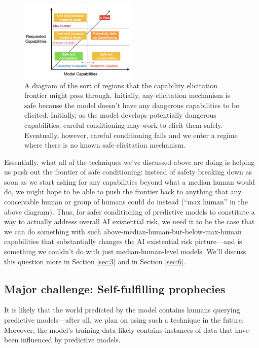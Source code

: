 \documentclass[
  twocolumn,
  natbib,
]{miri-tech-article}
\begin{document}
\begin{figure}[h!]
  \centering
  \includegraphics[width=0.5\textwidth]{n3TBfx6.png}
  \caption{A diagram of the sort of regions that the capability elicitation frontier might pass through. Initially, any elicitation mechanism is safe because the model doesn't have any dangerous capabilities to be elicited. Initially, as the model develops potentially dangerous capabilities, careful conditioning may work to elicit them safely. Eventually, however, careful conditioning fails and we enter a regime where there is no known safe elicitation mechanism.}
\end{figure}

Essentially, what all of the techniques we've discussed above are doing is helping us push out the frontier of safe conditioning: instead of safety breaking down as soon as we start asking for any capabilities beyond what a median human would do, we might hope to be able to push the frontier back to anything that any conceivable human or group of humans could do instead (``max human'' in the above diagram). Thus, for safer conditioning of predictive models to constitute a way to actually address overall AI existential risk, we need it to be the case that we can do something with such above-median-human-but-below-max-human capabilities that substantially changes the AI existential risk picture---and is something we couldn't do with just median-human-level models. We'll discuss this question more in Section \ref{sec:3} and in Section \ref{sec:6}.


\subsection{Major challenge: Self-fulfilling prophecies}
\label{sec:2d}

It is likely that the world predicted by the model contains humans querying predictive models---after all, we plan on using such a technique in the future. Moreover, the model's training data likely contains instances of data that have been influenced by predictive models.
\end{document}
